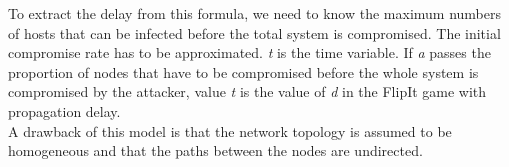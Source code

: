 To extract the delay from this formula, we need to know the maximum numbers of hosts that can be infected before the total system is compromised. The initial compromise rate has to be approximated. \textit{t} is the time variable. If \textit{a} passes the proportion of nodes that have to be compromised before the whole system is compromised by the attacker, value \textit{t}  is the value of \textit{d} in the FlipIt game with propagation delay.\\

A drawback of this model is that the network topology is assumed to be homogeneous and that the paths between the nodes are undirected. 

